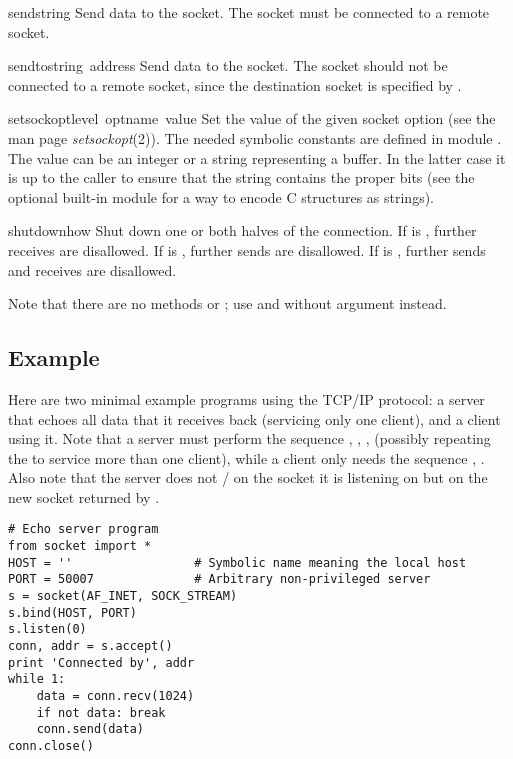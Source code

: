 \begin{funcdesc}{send}{string}
Send data to the socket.  The socket must be connected to a remote
socket.
\end{funcdesc}

\begin{funcdesc}{sendto}{string\, address}
Send data to the socket.  The socket should not be connected to a
remote socket, since the destination socket is specified by
.
\end{funcdesc}

\begin{funcdesc}{setsockopt}{level\, optname\, value}
Set the value of the given socket option (see the \UNIX{} man page
{\it setsockopt}(2)).  The needed symbolic constants are defined in module
.  The value can be an integer or a string representing a
buffer.  In the latter case it is up to the caller to ensure that the
string contains the proper bits (see the optional built-in module
 for a way to encode C structures as strings).
\end{funcdesc}

\begin{funcdesc}{shutdown}{how}
Shut down one or both halves of the connection.  If  is ,
further receives are disallowed.  If  is , further sends are
disallowed.  If  is , further sends and receives are
disallowed.
\end{funcdesc}

Note that there are no methods  or ; use
 and  without  argument instead.

\subsection{Example}

Here are two minimal example programs using the TCP/IP protocol: a
server that echoes all data that it receives back (servicing only one
client), and a client using it.  Note that a server must perform the
sequence , , , 
(possibly repeating the  to service more than one client),
while a client only needs the sequence , .
Also note that the server does not / on the
socket it is listening on but on the new socket returned by
.

\bcode\begin{verbatim}
# Echo server program
from socket import *
HOST = ''                 # Symbolic name meaning the local host
PORT = 50007              # Arbitrary non-privileged server
s = socket(AF_INET, SOCK_STREAM)
s.bind(HOST, PORT)
s.listen(0)
conn, addr = s.accept()
print 'Connected by', addr
while 1:
    data = conn.recv(1024)
    if not data: break
    conn.send(data)
conn.close()
\end{verbatim}\ecode

